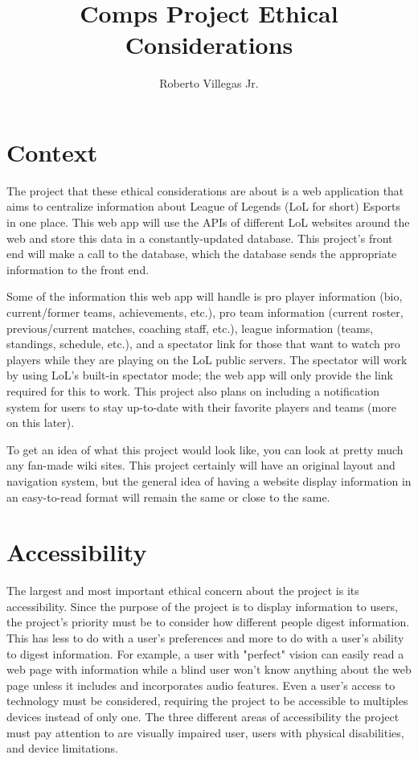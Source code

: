 \documentclass[10pt,twocolumn]{article}
\title{Comps Project Ethical Considerations}
\author{Roberto Villegas Jr.}
\affiliation{Occidental College}
\begin{document}
\maketitle

\section{Context}

The project that these ethical considerations are about is a web application that aims to centralize information about League of Legends (LoL for short) Esports in one place.
This web app will use the APIs of different LoL websites around the web and store this data in a constantly-updated database.
This project's front end will make a call to the database, which the database sends the appropriate information to the front end.

Some of the information this web app will handle is pro player information (bio, current/former teams, achievements, etc.), pro team information (current roster, previous/current matches, coaching staff, etc.), league information (teams, standings, schedule, etc.), and a spectator link for those that want to watch pro players while they are playing on the LoL public servers.
The spectator will work by using LoL's built-in spectator mode; the web app will only provide the link required for this to work.
This project also plans on including a notification system for users to stay up-to-date with their favorite players and teams (more on this later).

To get an idea of what this project would look like, you can look at pretty much any fan-made wiki sites.
This project certainly will have an original layout and navigation system, but the general idea of having a website display information in an easy-to-read format will remain the same or close to the same.

\section{Accessibility}

The largest and most important ethical concern about the project is its accessibility.
Since the purpose of the project is to display information to users, the project's priority must be to consider how different people digest information.
This has less to do with a user's preferences and more to do with a user's ability to digest information.
For example, a user with "perfect" vision can easily read a web page with information while a blind user won't know anything about the web page unless it includes and incorporates audio features.
Even a user's access to technology must be considered, requiring the project to be accessible to multiples devices instead of only one.
The three different areas of accessibility the project must pay attention to are visually impaired user, users with physical disabilities, and device limitations.
\end{document}
